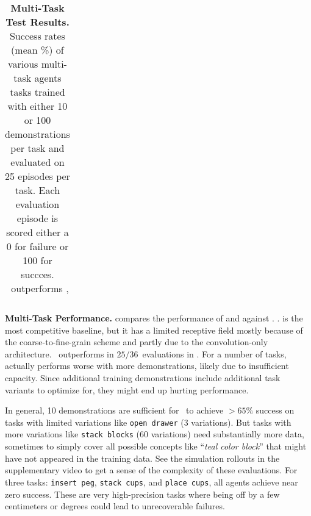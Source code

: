 \begin{table}[!t]
\begin{tabular}{lcccccccccccccccccc}
\bottomrule
\end{tabular}
\vspace{2pt}
\caption{\textbf{Multi-Task Test Results.} Success rates (mean \%) of various multi-task agents tasks trained with either 10 or 100 demonstrations per task and evaluated on 25 episodes per task. Each evaluation episode is scored either a 0 for failure or 100 for succces. \model~outperforms \unet\citep{c2farm}, }
\vspace{-0.8cm}
\label{table:rlbench}
\end{table}
\textbf{Multi-Task Performance.}  compares the performance of \bcz and \unet against \model. . \unet is the most competitive baseline, but it has a limited receptive field mostly because of the coarse-to-fine-grain scheme and partly due to the convolution-only architecture. \model~outperforms \unet in $25/36$~evaluations in  . For a number of tasks, \unet actually performs worse with more demonstrations, likely due to insufficient capacity. Since additional training demonstrations include additional task variants to optimize for, they might end up hurting performance. 

\vspace{-0.05cm}
In general, 10 demonstrations are sufficient for \model~to achieve $>65\%$ success on tasks with limited variations like \texttt{open drawer} (3 variations). But tasks with more variations like \texttt{stack blocks} (60 variations) need substantially more data, sometimes to simply cover all possible concepts like ``\textit{teal color block}'' that might have not appeared in the training data. See the simulation rollouts in the supplementary video to get a sense of the complexity of these evaluations. For three tasks: \texttt{insert peg}, \texttt{stack cups}, and \texttt{place cups}, all agents achieve near zero success. These are  very high-precision tasks where being off by a few centimeters or degrees could lead to unrecoverable failures. 

